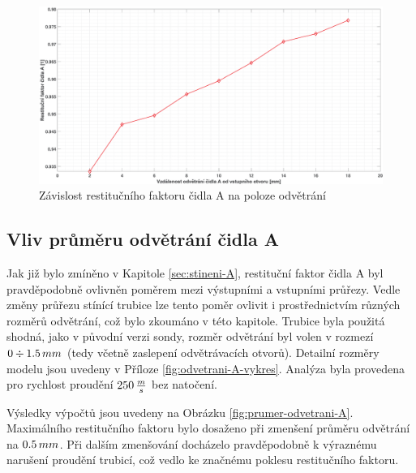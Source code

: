           \begin{figure}[ht!]
            \centering
            \includegraphics*[width=\textwidth]{400_SIMULACE_KONSTRUKCNICH_UPRAV/Grafy/06_poloha_odvetrani_A.eps}
            \caption{Závislost restitučního faktoru čidla A na poloze odvětrání}
            \label{fig:poloha-odvetrani-A}
        \end{figure}
    
    \newpage
    \subsection{Vliv průměru odvětrání čidla A} \label{sec:prumer-odvetrani}
        Jak již bylo zmíněno v Kapitole \ref{sec:stineni-A}, restituční faktor čidla A byl pravděpodobně ovlivněn poměrem mezi výstupními a vstupními průřezy. Vedle změny průřezu stínící trubice lze tento poměr ovlivit i prostřednictvím různých rozměrů odvětrání, což bylo zkoumáno v této kapitole. Trubice byla použitá shodná, jako v původní verzi sondy, rozměr odvětrání byl volen v rozmezí $0 \div 1.5 \, mm$ (tedy včetně zaslepení odvětrávacích otvorů). Detailní rozměry modelu jsou uvedeny v Příloze \ref{fig:odvetrani-A-vykres}. Analýza byla provedena pro rychlost proudění $250 \, \frac{m}{s}$ bez natočení.

        Výsledky výpočtů jsou uvedeny na Obrázku \ref{fig:prumer-odvetrani-A}. Maximálního restitučního faktoru bylo dosaženo při zmenšení průměru odvětrání na $0.5 \, mm$. Při dalším zmenšování docházelo pravděpodobně k výraznému narušení proudění trubicí, což vedlo ke značnému poklesu restitučního faktoru.
        
